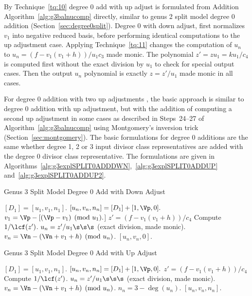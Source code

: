 By Technique~\ref{tq:10} degree 0 add with up adjust is formulated from Addition
Algorithm~\ref{alg:g3balnucomp} directly, similar to genus 2 split model degree
0 addition (Section~\ref{sec:degree0split}). Degree 0 with down adjust, first
normalizes $v_1$ into negative reduced basis, before performing identical
computations to the up adjustment case. Applying Technique~\ref{tq:11} changes
the computation of $u_n$ to $u_n = (f - v_1(v_1 + h))/u_1c_3$ made monic. The
polynomial $z' = zu_1 = ku_1/c_4$ is computed first without the exact division
by $u_1$ to check for special output cases. Then the output $u_n$ polynomial is
exactly $z = z'/u_1$ made monic in all cases.

For degree 0 addition with two up adjustments , the basic approach is similar to
degree 0 addition with up adjustment, but with the addition of computing a
second up adjustment in some cases as described in Steps~24--27 of
Algorithm~\ref{alg:g3balnucomp} using Montgomery's inversion trick
(Section~\ref{sec:montgomery}). The basic formulations for degree 0 additions
are the same whether degree 1, 2 or 3 input divisor class representatives are
added with the degree 0 divisor class representative. The formulations are given in
Algorithms~\ref{alg:g3explSPLIT0ADDDWN},~\ref{alg:g3explSPLIT0ADDUP}
and~\ref{alg:g3explSPLIT0ADDUP2}.

\begin{algorithm}[H]
\caption{Genus 3 Split Model Degree 0 Add with Down Adjust\label{alg:g3explSPLIT0ADDDWN}}
\begin{algorithmic} [1]
\Require $[D_1] = [u_1, v_1, n_1]$. \smallskip
\Ensure $[u_n,v_n,n_n] = [D_1] + [1,\Vp,0].$
\algrule
\State $v_1 =  \Vp - [(\Vp - v_1) \pmod{u_1}.$]
\State $z' = (f - v_1(v_1 + h))/c_4$
\State Compute $1/\lcf(z')$.
\State $u_n = z'/u_1 \s\s\s$ (exact division, made monic).
\State $v_n = \Vn - (\Vn + v_1 + h) \pmod{u_n}$.
\State \Return $[u_n,v_n,0]$.
\end{algorithmic}
\end{algorithm}

\begin{algorithm}[H]
\caption{Genus 3 Split Model Degree 0 Add with Up Adjust\label{alg:g3explSPLIT0ADDUP}}
\begin{algorithmic} [1]
\Require $[D_1] = [u_1, v_1, n_1]$. \smallskip
\Ensure $[u_n,v_n,n_n] = [D_1] + [1,\Vp,0].$
\algrule
\State $z' = (f - v_1(v_1 + h))/c_4$
\State Compute $1/\lcf(z')$.
\State $u_n = z'/u_1 \s\s\s$ (exact division, made monic).
\State $v_n = \Vn - (\Vn + v_1 + h) \pmod{u_n}$.
\State $n_n = 3 - \deg(u_n)$.
\State \Return $[u_n,v_n,n_n]$.
\end{algorithmic}
\end{algorithm}


